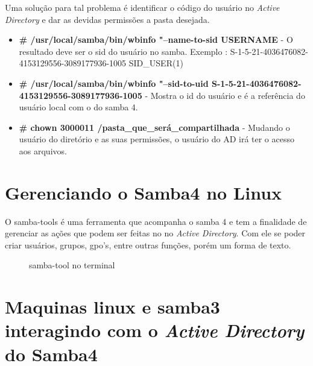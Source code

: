 Uma solução para tal problema é identificar o código do usuário no \textit{Active Directory} e dar as devidas permissões a pasta desejada.

\begin{itemize}
	\item \textbf{\# /usr/local/samba/bin/wbinfo "--name-to-sid USERNAME} - O resultado deve ser o sid do usuário no samba. Exemplo : S-1-5-21-4036476082-4153129556-3089177936-1005 SID\_USER(1)
	\item \textbf{\# /usr/local/samba/bin/wbinfo "--sid-to-uid S-1-5-21-4036476082-4153129556-3089177936-1005} - Mostra o id do usuário e é a referência do usuário local com o do samba 4.
	\item \textbf{\# chown 3000011 /pasta\_que\_será\_compartilhada} - Mudando o usuário do diretório e as suas permissões, o usuário do AD irá ter o acesso aos arquivos.
\end{itemize} 

\section{Gerenciando o Samba4 no Linux}

O samba-tools é uma ferramenta que acompanha o samba 4 e tem a finalidade de gerenciar as ações que podem ser feitas no no \textit{Active Directory}. Com ele se poder criar usuários, grupos, gpo's, entre outras funções, porém um forma de texto.

\begin{figure}[ht]
   	\centering
   	\caption{samba-tool no terminal}
    \label{Samba-tool}
\end{figure}

\section{Maquinas linux e samba3 interagindo com o \textit{Active Directory} do  Samba4}

